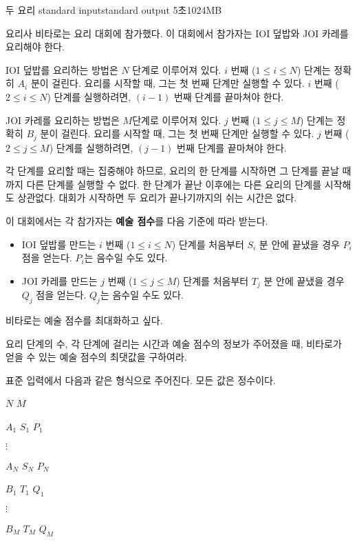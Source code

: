 \begin{problem}{두 요리}
	{standard input}{standard output}
	{5초}{1024MB}{}
	
	요리사 비타로는 요리 대회에 참가했다. 이 대회에서 참가자는 IOI 덮밥와 JOI 카레를 요리해야 한다.
	
	IOI 덮밥를 요리하는 방법은 $N$ 단계로 이루어져 있다. $i$ 번째 ($1 \le i \le N$) 단계는 정확히 $A_i$ 분이 걸린다. 요리를 시작할 때, 그는 첫 번째 단계만 실행할 수 있다. $i$ 번째 ($2 \le i \le N$) 단계를 실행하려면, $(i-1)$ 번째 단계를 끝마쳐야 한다.
	
	JOI 카레를 요리하는 방법은 $M$단계로 이루어져 있다. $j$ 번째 ($1 \le j \le M$) 단계는 정확히 $B_j$ 분이 걸린다. 요리를 시작할 때, 그는 첫 번째 단계만 실행할 수 있다. $j$ 번째 ($2 \le j \le M$) 단계를 실행하려면, $(j-1)$ 번째 단계를 끝마쳐야 한다.
	
	각 단계를 요리할 때는 집중해야 하므로, 요리의 한 단계를 시작하면 그 단계를 끝날 때까지 다른 단계를 실행할 수 없다. 한 단계가 끝난 이후에는 다른 요리의 단계를 시작해도 상관없다. 대회가 시작하면 두 요리가 끝나기까지의 쉬는 시간은 없다.
	
	이 대회에서는 각 참가자는 \textbf{예술 점수}를 다음 기준에 따라 받는다.
	
	\begin{itemize}
		\item IOI 덮밥를 만드는 $i$ 번째 ($1 \le i \le N$) 단계를 처음부터 $S_i$ 분 안에 끝냈을 경우 $P_i$ 점을 얻는다. $P_i$는 음수일 수도 있다.
		\item JOI 카레를 만드는 $j$ 번째 ($1 \le j \le M$) 단계를 처음부터 $T_j$ 분 안에 끝냈을 경우 $Q_j$ 점을 얻는다. $Q_j$는 음수일 수도 있다.
	\end{itemize} 

	비타로는 예술 점수를 최대화하고 싶다.
	
	요리 단계의 수, 각 단계에 걸리는 시간과 예술 점수의 정보가 주어졌을 때, 비타로가 얻을 수 있는 예술 점수의 최댓값을 구하여라.
	
	\InputFile
	
	표준 입력에서 다음과 같은 형식으로 주어진다. 모든 값은 정수이다.
	
	$N$ $M$
	
	$A_1$ $S_1$ $P_1$
	
	$\vdots$
	
	$A_N$ $S_N$ $P_N$
		
	$B_1$ $T_1$ $Q_1$
	
	$\vdots$
	
	$B_M$ $T_M$ $Q_M$
	
	\OutputFile
	

\end{problem}
